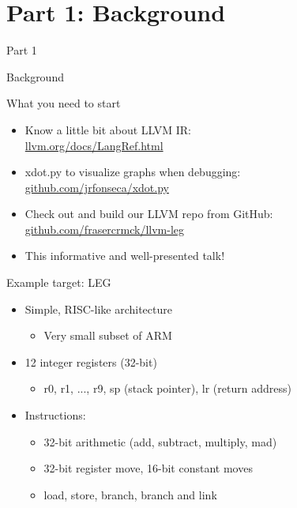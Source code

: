 \section{Part 1: Background}

\begin{frame}{Part 1}

Background

\end{frame}


\begin{frame}{What you need to start}

\begin{itemize}
    \item Know a little bit about LLVM IR: \\ \url{llvm.org/docs/LangRef.html}
    \item xdot.py to visualize graphs when debugging: \\ \url{github.com/jrfonseca/xdot.py}
    \item Check out and build our LLVM repo from GitHub: \\ \url{github.com/frasercrmck/llvm-leg}
    \item This informative and well-presented talk!
\end{itemize}

\end{frame}


\begin{frame}{Example target: LEG}

\begin{itemize}
    \item Simple, RISC-like architecture
    \begin{itemize}
        \item Very small subset of ARM
    \end{itemize}
    \item 12 integer registers (32-bit)
    \begin{itemize}
        \item r0, r1, ..., r9, sp (stack pointer), lr (return address)
    \end{itemize}
    \item Instructions:
    \begin{itemize}
        \item 32-bit arithmetic (add, subtract, multiply, mad)
        \item 32-bit register move, 16-bit constant moves
        \item load, store, branch, branch and link
    \end{itemize}
\end{itemize}

\end{frame}

